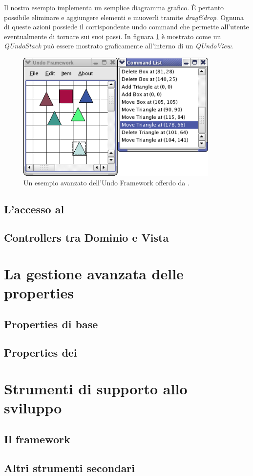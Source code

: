 Il nostro esempio implementa un semplice diagramma grafico. È pertanto possibile eliminare e aggiungere elementi e muoverli tramite \emph{drag\&{}drop}. Ognuna di queste azioni possiede il corrispondente undo command che permette all'utente eventualmente di tornare sui suoi passi.
In figuara \ref{figura:qt_undo} è mostrato come un \emph{QUndoStack} può essere mostrato graficamente all'interno di un \emph{QUndoView}.

\begin{figure}[!htb]
	\centering
	\includegraphics[width=10cm]{images/undoframeworkexample.png}
	\caption{Un esempio avanzato dell'Undo Framework offerdo da \qt{}.}
	\label{figura:qt_undo}
\end{figure}

\subsection{L'accesso al \fs{}}

\subsection{Controllers tra Dominio e Vista}

\section{La gestione avanzata delle properties}
\subsection{Properties di base}
\subsection{Properties dei \plugin{}}

\section{Strumenti di supporto allo sviluppo}
\subsection{Il framework \qt{}}
\subsection{Altri strumenti secondari}
